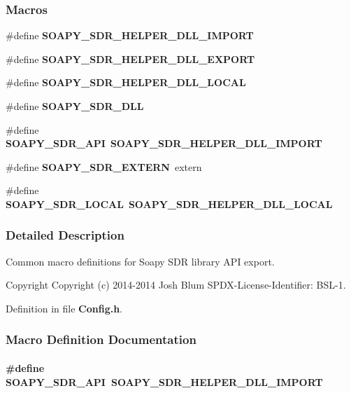\subsubsection*{Macros}
\begin{DoxyCompactItemize}
\item 
\#define {\bf S\+O\+A\+P\+Y\+\_\+\+S\+D\+R\+\_\+\+H\+E\+L\+P\+E\+R\+\_\+\+D\+L\+L\+\_\+\+I\+M\+P\+O\+RT}
\item 
\#define {\bf S\+O\+A\+P\+Y\+\_\+\+S\+D\+R\+\_\+\+H\+E\+L\+P\+E\+R\+\_\+\+D\+L\+L\+\_\+\+E\+X\+P\+O\+RT}
\item 
\#define {\bf S\+O\+A\+P\+Y\+\_\+\+S\+D\+R\+\_\+\+H\+E\+L\+P\+E\+R\+\_\+\+D\+L\+L\+\_\+\+L\+O\+C\+AL}
\item 
\#define {\bf S\+O\+A\+P\+Y\+\_\+\+S\+D\+R\+\_\+\+D\+LL}
\item 
\#define {\bf S\+O\+A\+P\+Y\+\_\+\+S\+D\+R\+\_\+\+A\+PI}~{\bf S\+O\+A\+P\+Y\+\_\+\+S\+D\+R\+\_\+\+H\+E\+L\+P\+E\+R\+\_\+\+D\+L\+L\+\_\+\+I\+M\+P\+O\+RT}
\item 
\#define {\bf S\+O\+A\+P\+Y\+\_\+\+S\+D\+R\+\_\+\+E\+X\+T\+E\+RN}~extern
\item 
\#define {\bf S\+O\+A\+P\+Y\+\_\+\+S\+D\+R\+\_\+\+L\+O\+C\+AL}~{\bf S\+O\+A\+P\+Y\+\_\+\+S\+D\+R\+\_\+\+H\+E\+L\+P\+E\+R\+\_\+\+D\+L\+L\+\_\+\+L\+O\+C\+AL}
\end{DoxyCompactItemize}


\subsubsection{Detailed Description}
Common macro definitions for Soapy S\+DR library A\+PI export. 

\begin{DoxyCopyright}{Copyright}
Copyright (c) 2014-\/2014 Josh Blum S\+P\+D\+X-\/\+License-\/\+Identifier\+: B\+S\+L-\/1. 
\end{DoxyCopyright}


Definition in file {\bf Config.\+h}.



\subsubsection{Macro Definition Documentation}
\paragraph[{S\+O\+A\+P\+Y\+\_\+\+S\+D\+R\+\_\+\+A\+PI}]{\setlength{\rightskip}{0pt plus 5cm}\#define S\+O\+A\+P\+Y\+\_\+\+S\+D\+R\+\_\+\+A\+PI~{\bf S\+O\+A\+P\+Y\+\_\+\+S\+D\+R\+\_\+\+H\+E\+L\+P\+E\+R\+\_\+\+D\+L\+L\+\_\+\+I\+M\+P\+O\+RT}}\label{Config_8h_ae741d098469b68e36cc8238ca2005026}


